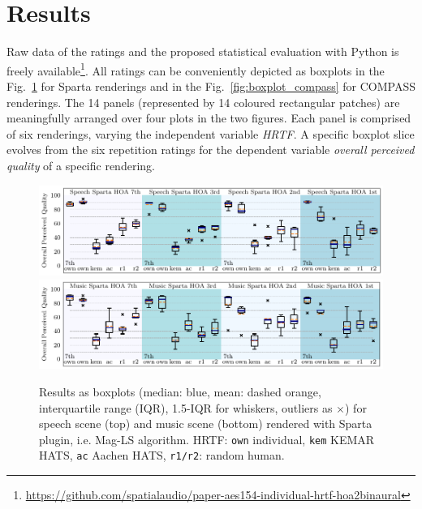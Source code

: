 \documentclass[conference]{IEEEtran}
\begin{document}
\section{Results}
%
Raw data of the ratings and the proposed statistical evaluation with Python is freely available\footnote{\url{https://github.com/spatialaudio/paper-aes154-individual-hrtf-hoa2binaural}}.
%
All ratings can be conveniently depicted as boxplots in the Fig.~\ref{fig:boxplot_sparta} for Sparta renderings and in the Fig.~\ref{fig:boxplot_compass} for COMPASS renderings.
%
The 14 panels (represented by 14 coloured rectangular patches) are meaningfully arranged over four plots in the two figures.
%
Each panel is comprised of six renderings, varying the independent variable \textit{HRTF}.
%
A specific boxplot slice evolves from the six repetition ratings for the dependent variable \textit{overall perceived quality} of a specific rendering.
%
\begin{figure}[t]
\begin{center}
\includegraphics[width=1\textwidth]{../graphics/speech_sparta_aes154.pdf}
\includegraphics[width=1\textwidth]{../graphics/music_sparta_aes154.pdf}
\caption{Results as boxplots (median: blue, mean: dashed orange, interquartile range (IQR), 1.5-IQR for whiskers, outliers as $\times$) for speech scene (top) and music scene (bottom) rendered with Sparta plugin, i.e. Mag-LS algorithm. HRTF: \texttt{own} individual, \texttt{kem} KEMAR HATS, \texttt{ac} Aachen HATS, \texttt{r1/r2}: random human.}
\label{fig:boxplot_sparta}
\end{center}
\end{figure}
%
\end{document}
